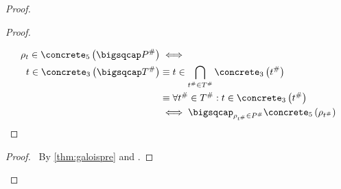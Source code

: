 \begin{proof}
\begin{proof}
\begin{align}
        \end{align}
        \begin{align}
            \rho_t \in \concrete_5 \left( \bigsqcap P^\# \right)
            &\iff \\
            t \in \concrete_3 \left( \bigsqcap T^\# \right)
            &\equiv
            t \in \bigcap_{t^\# \in T^\#} \concrete_3 \left(t^\# \right) \\
            &\equiv
            \forall t^\# \in T^\# : t \in \concrete_3 \left(t^\# \right) \\
            &\iff \bigsqcap_{\rho_{t^\#} \in P^\#} \concrete_5 \left( \rho_{t^\#} \right)
        \end{align}
    \end{proof}
    \qedstep
    \begin{proof}
        \pf\ By \autoref{thm:galoispre} and .
    \end{proof}
\end{proof}
